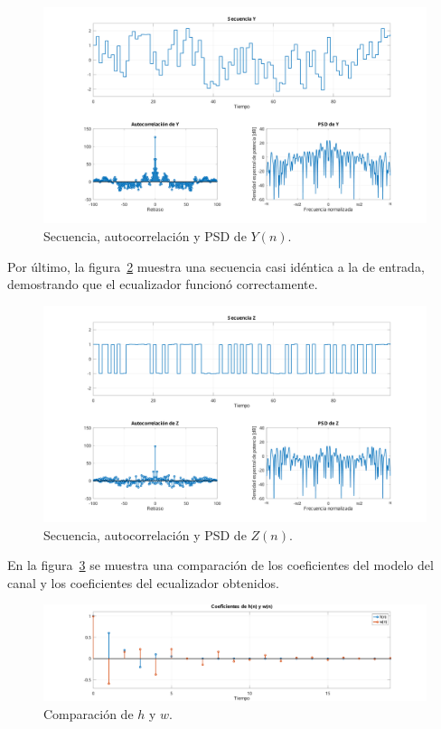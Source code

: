 \begin{figure}[!hbp]
	\centering
	\includegraphics[width=1\linewidth,trim=4cm 0 4cm 0,clip]{img/ej3_y.pdf}
	\caption{Secuencia, autocorrelación y PSD de $Y(n)$.}
	\label{fig:ej3_y}
\end{figure}

Por último, la figura~\ref{fig:ej3_z} muestra una secuencia casi idéntica a la de entrada, demostrando que el ecualizador funcionó correctamente.

\begin{figure}[!hbp]
	\centering
	\includegraphics[width=1\linewidth,trim=4cm 0 4cm 0,clip]{img/ej3_z.pdf}
	\caption{Secuencia, autocorrelación y PSD de $Z(n)$.}
	\label{fig:ej3_z}
\end{figure}

En la figura~\ref{fig:ej3_coef} se muestra una comparación de los coeficientes del modelo del canal y los coeficientes del ecualizador obtenidos.

\begin{figure}[!hbp]
	\centering
	\includegraphics[width=\linewidth,trim=4cm 0 4cm 0,clip]{img/ej3_coef.pdf}
	\caption{Comparación de $h$ y $w$.}
	\label{fig:ej3_coef}
\end{figure}

